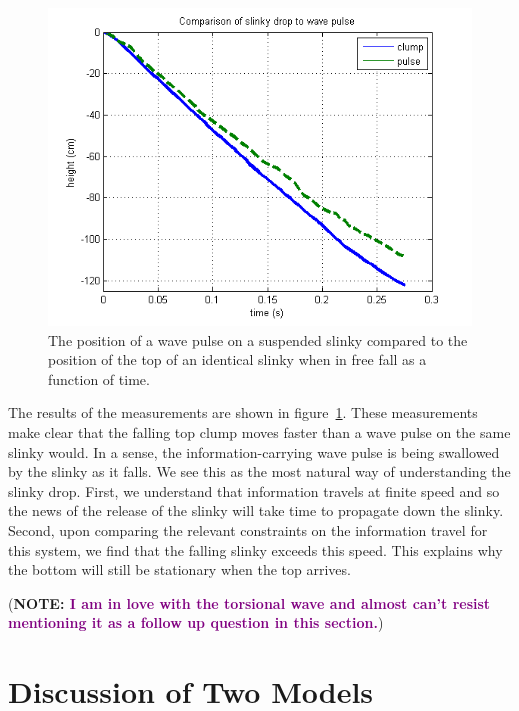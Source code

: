 \documentclass[prb,preprint]{revtex4-1}
\newcommand{\NOTE}[1]{\marginpar{\footnotesize\textbf{NOTE}} (\textbf{NOTE: #1})}
\newcommand{\calvin}[2]{\textcolor{purple}{\sout{#1}#2}}
\newcommand{\fig}[1]{figure~\ref{fig:#1}}
\begin{document}
\begin{figure}[t!]
\begin{center}
\includegraphics[scale=0.5]{figs/ClumpPulse}
\end{center}
\vspace{-4ex}
\caption{The position of a wave pulse on a suspended slinky compared to the position
of the top of an identical slinky when in free fall as a function of time.}
\label{fig:clumppulse}
\end{figure}

The results of the measurements are shown in \fig{clumppulse}. These measurements
make clear that the falling top clump moves faster than a wave pulse on the same
slinky would. In a sense, the information-carrying wave pulse is being swallowed
by the slinky as it falls. We see this as the most natural way of understanding the
slinky drop. First, we understand that information travels at finite speed and so
the news of the release of the slinky will take time to propagate down the slinky.
Second, upon comparing the relevant constraints on the information travel for this
system, we find that the falling slinky exceeds this speed. This explains why the
bottom will still be stationary when the top arrives.

\NOTE{\calvin{}{I am in love with the torsional wave and almost can't resist
mentioning it as a follow up question in this section.}}

\section{Discussion of Two Models}
\label{sec:discussion}
\end{document}
